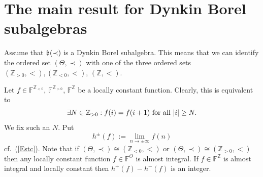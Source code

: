 \documentclass[10pt]{amsart}\oddsidemargin -1mm \evensidemargin -1mm \topmargin -15mm\headheight5mm \headsep 3.5mm \textheight 245mm\textwidth 170mm
\theoremstyle{definition}\newtheorem{theorem}{Theorem}[section]\newtheorem{lemma}[theorem]{Lemma}\newtheorem{remark}[theorem]{Remark}\newtheorem{proposition}[theorem]{Proposition}\newtheorem{corollary}[theorem]{Corollary}\newtheorem{definition}[theorem]{Definition}\newtheorem{Ex}[theorem]{Example}\newtheorem{obs}[theorem]{Observation}\newtheorem{nota}[theorem]{Notation}
\begin{document}
\section{The main result for Dynkin Borel subalgebras}\label{SDynk}
Assume that $\frak b(\prec)$ is a Dynkin Borel subalgebra. 
This means that we can identify the ordered set $(\Theta, \prec)$ with one of the three ordered sets $(\mathbb Z_{>0}, <), (\mathbb Z_{<0}, <)$, $(\mathbb Z, <)$. 

Let $f\in\mathbb F^{\mathbb Z_{<0}}$, $\mathbb F^{\mathbb Z_{>0}}$, $\mathbb F^{\mathbb Z}$ be a locally constant function. 
Clearly, this is equivalent to
\begin{equation}\exists N\in\mathbb Z_{>0}: f(i)=f(i+1){\rm~for~all~}|i|\ge N.\label{Estc}\end{equation}
We fix such an $N$. Put
$$h^\pm(f):=\lim\limits_{n\to\pm\infty}f(n)$$
cf.~(\ref{Estc}). Note that if $(\Theta, \prec)\cong (\mathbb Z_{<0}, <)$ or $(\Theta, \prec)\cong (\mathbb Z_{>0}, <)$ then any locally constant function $f\in\mathbb F^\Theta$ is almost integral. 
If $f\in\mathbb F^\mathbb Z$ is almost integral and locally constant then $h^+(f)-h^-(f)$ is an integer. 
\end{document}
